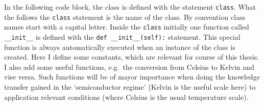 \documentclass[11pt]{article}
\begin{document}
In the following code block, the class is defined with the statement
\texttt{class}. What the follows the \texttt{class} statement is the
name of the class. By convention class names start with a capital
letter. Inside the \texttt{class} initially one function called
\texttt{\_\_init\_\_} is defined with the
\texttt{def\ \_\_init\_\_(self):} statement. This special function is
always automatically executed when an instance of the class is created.
Here I define some constants, which are relevant for course of this
thesis. I also add some useful functions, e.g.~the conversion from
Celsius to Kelvin and vise versa. Such functions will be of mayor
importance when doing the knowledge transfer gained in the
`semiconductor regime' (Kelvin is the useful scale here) to application
relevant conditions (where Celsius is the usual temperature scale).
\end{document}
